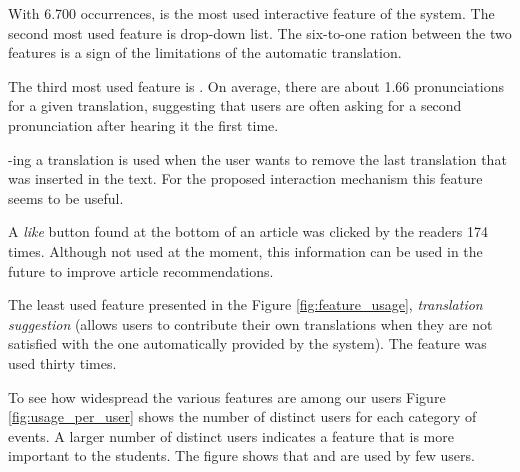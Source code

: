 With 6.700 occurrences,  is the most used interactive feature of the system. The second most used feature is  drop-down list. The six-to-one ration between the two features is a sign of the limitations of the automatic translation.

The third most used feature is . On average, there are about 1.66 pronunciations for a given translation, suggesting that users are often asking for a second pronunciation after hearing it the first time. 



-ing a translation is used when the user wants to remove the last translation that was inserted in the text. For the proposed interaction mechanism this feature seems to be useful. 

A {\em like} button found at the bottom of an article  was clicked by the readers 174 times. Although not used at the moment, this information can be used in the future to improve article recommendations.

The least used feature presented in the Figure \ref{fig:feature_usage}, {\em translation suggestion} (allows users to contribute their own translations when they are not satisfied with the one automatically provided by the system). The feature was used thirty times.  




To see how widespread the various features are among our users Figure \ref{fig:usage_per_user} shows the number of distinct users for each category of events. A larger number of distinct users indicates a feature that is more important to the students. The figure shows that  and  are used by few users. 

